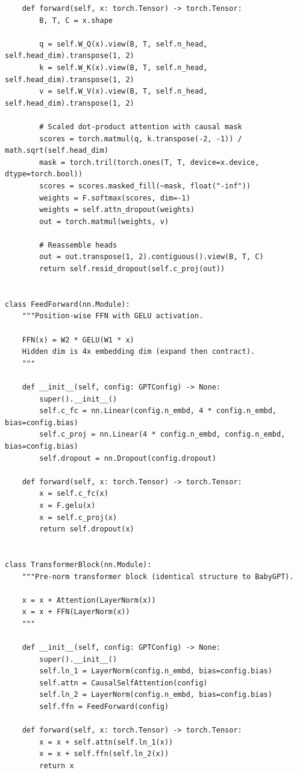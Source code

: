 \begin{lstlisting}
    def forward(self, x: torch.Tensor) -> torch.Tensor:
        B, T, C = x.shape

        q = self.W_Q(x).view(B, T, self.n_head, self.head_dim).transpose(1, 2)
        k = self.W_K(x).view(B, T, self.n_head, self.head_dim).transpose(1, 2)
        v = self.W_V(x).view(B, T, self.n_head, self.head_dim).transpose(1, 2)

        # Scaled dot-product attention with causal mask
        scores = torch.matmul(q, k.transpose(-2, -1)) / math.sqrt(self.head_dim)
        mask = torch.tril(torch.ones(T, T, device=x.device, dtype=torch.bool))
        scores = scores.masked_fill(~mask, float("-inf"))
        weights = F.softmax(scores, dim=-1)
        weights = self.attn_dropout(weights)
        out = torch.matmul(weights, v)

        # Reassemble heads
        out = out.transpose(1, 2).contiguous().view(B, T, C)
        return self.resid_dropout(self.c_proj(out))


class FeedForward(nn.Module):
    """Position-wise FFN with GELU activation.

    FFN(x) = W2 * GELU(W1 * x)
    Hidden dim is 4x embedding dim (expand then contract).
    """

    def __init__(self, config: GPTConfig) -> None:
        super().__init__()
        self.c_fc = nn.Linear(config.n_embd, 4 * config.n_embd, bias=config.bias)
        self.c_proj = nn.Linear(4 * config.n_embd, config.n_embd, bias=config.bias)
        self.dropout = nn.Dropout(config.dropout)

    def forward(self, x: torch.Tensor) -> torch.Tensor:
        x = self.c_fc(x)
        x = F.gelu(x)
        x = self.c_proj(x)
        return self.dropout(x)


class TransformerBlock(nn.Module):
    """Pre-norm transformer block (identical structure to BabyGPT).

    x = x + Attention(LayerNorm(x))
    x = x + FFN(LayerNorm(x))
    """

    def __init__(self, config: GPTConfig) -> None:
        super().__init__()
        self.ln_1 = LayerNorm(config.n_embd, bias=config.bias)
        self.attn = CausalSelfAttention(config)
        self.ln_2 = LayerNorm(config.n_embd, bias=config.bias)
        self.ffn = FeedForward(config)

    def forward(self, x: torch.Tensor) -> torch.Tensor:
        x = x + self.attn(self.ln_1(x))
        x = x + self.ffn(self.ln_2(x))
        return x



\end{lstlisting}
